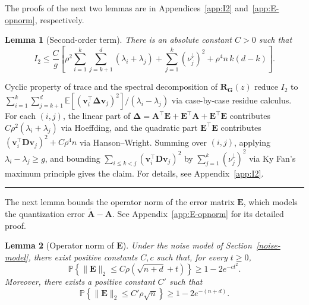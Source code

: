 \documentclass{article}
\newcommand{\twonorm}[1]{\|#1\|_2}
\newcommand{\Ex}[1]{\mbox{}\mathbb{E}\left[#1\right]}
\newcommand{\pr}[1]{\mbox{}\mathbb{P}\left(#1\right)}
\newcommand{\ts}{\top}
\newcommand{\vb}{\mathbf{v}}
\newcommand{\Ab}{\mathbf{A}}
\newcommand{\Db}{\mathbf{D}}
\newcommand{\Eb}{\mathbf{E}}
\newcommand{\Gb}{\mathbf{G}}
\newcommand{\Rb}{\mathbf{R}}
\newcommand{\Abtil}{\tilde{\Ab}}
\newcommand{\BlackBox}{\rule{1.5ex}{1.5ex}}  %
\newenvironment{proof}{\par\noindent{\bf Proof\ }}{\hfill\BlackBox\par\medskip}
\newtheorem{lemma}{Lemma}[section]
\newcommand{\rbr}[1]{\left(#1\right)}
\newcommand{\sbr}[1]{\left[#1\right]}
\newcommand{\Deltab}{\boldsymbol{\Delta}}
\begin{document}
The proofs of the next two lemmas are in Appendices~\ref{app:I2} and~\ref{app:E-opnorm}, respectively.

\begin{lemma}[Second-order term]\label{lem:I2}
There is an absolute constant $C > 0$ such that
\begin{equation*}
    I_2 \le \frac{C}{g}\sbr{\rho^2 \sum_{i=1}^{k}\sum_{j=k+1}^{d}(\lambda_i + \lambda_j) + \sum_{j=1}^{k}\rbr{\nu_j^\downarrow}^2 + \rho^4 n\, k(d-k)}.
\end{equation*}
\end{lemma}

\begin{proof}
    Cyclic property of trace and the spectral decomposition of $\Rb_\Gb(z)$ reduce $I_2$ to $\sum_{i=1}^k \sum_{j=k+1}^d \Ex{(\vb_i^\ts \Deltab \vb_j)^2}/(\lambda_i - \lambda_j)$ via case-by-case residue calculus. For each $(i,j)$, the linear part of $\Deltab = \Ab^\ts\Eb + \Eb^\ts\Ab + \Eb^\ts\Eb$ contributes $C\rho^2(\lambda_i + \lambda_j)$ via Hoeffding, and the quadratic part $\Eb^\ts \Eb$ contributes $(\vb_i^\ts \Db \vb_j)^2 + C\rho^4 n$ via Hanson--Wright. Summing over $(i,j)$, applying $\lambda_i - \lambda_j \ge g$, and bounding $\sum_{i \le k < j}(\vb_i^\ts \Db \vb_j)^2$ by $\sum_{j=1}^{k}(\nu_j^\downarrow)^2$ via Ky Fan's maximum principle gives the claim. 
   For details, see Appendix~\ref{app:I2}.
\end{proof}



The next lemma bounds the operator norm of the error matrix $\Eb$, which models the quantization error $\Abtil-\Ab$. See Appendix~\ref{app:E-opnorm} for its detailed proof.

\begin{lemma}[Operator norm of $\Eb$]\label{lem:E-opnorm}
Under the noise model of Section~\ref{noise-model}, there exist positive constants $C,c$ such that, for every $t\ge 0$,
\[
    \mathbb P\left\{
    \|\Eb\|_2\le C\rho(\sqrt{n+d}+t)
    \right\}
    \ge 1- 2e^{-ct^2}.
\]
Moreover, there exists a positive constant $C'$ such that
\[
    \mathbb P\left\{
    \|\Eb\|_2\le C'\rho\sqrt n
    \right\}
    \ge 1-2e^{-(n+d)}.
\]
\end{lemma}
\end{document}
